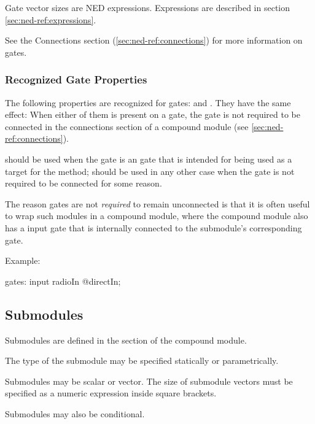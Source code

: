 Gate vector sizes are NED expressions. Expressions are described in section
\ref{sec:ned-ref:expressions}.

See the Connections section (\ref{sec:ned-ref:connections}) for more
information on gates.

\subsubsection{Recognized Gate Properties}
\label{sec:ned-ref:recognized-gate-properties}

The following properties are recognized for gates: 
and . They have the same effect: When either of them is
present on a gate, the gate is not required to be connected in the
connections section of a compound module (see \ref{sec:ned-ref:connections}).

 should be used when the gate is an  gate that is
intended for being used as a target for the  method;
 should be used in any other case when the gate is not
required to be connected for some reason.

\begin{note}
    The reason  gates are not \textit{required} to remain
    unconnected is that it is often useful to wrap such modules in a compound
    module, where the compound module also has a  input gate
    that is internally connected to the submodule's corresponding gate.
\end{note}

Example:

\begin{ned}
gates:
    input radioIn @directIn;
\end{ned}



\subsection{Submodules}
\label{sec:ned-ref:submodules}

Submodules are defined in the  section of the compound
module.

The type of the submodule may be specified statically or parametrically.

Submodules may be scalar or vector. The size of submodule vectors must be
specified as a numeric expression inside square brackets.

Submodules may also be conditional.

